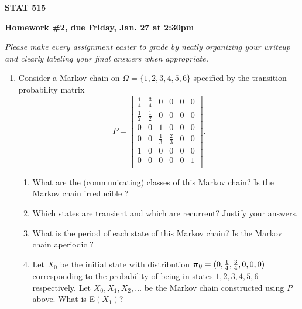 \documentclass{article}
\begin{document}
\begin{center}
{\bf STAT 515}

{\bf Homework \#2, due Friday, Jan. 27 at 2:30pm}
\end{center}

{\it Please make every assignment easier to grade by neatly organizing your
writeup and clearly labeling your final answers when appropriate.}
   

\begin{enumerate}

  \item\label{midtermprob} 
  Consider a Markov chain on $\Omega=\{1, 2, 3, 4, 5, 6\}$ specified by the
  transition probability matrix\\
  \begin{equation*}
    P=
    \begin{bmatrix}
      \frac{1}{4} & \frac{3}{4}   & 0  & 0 & 0 & 0\\
      \frac{1}{2} & \frac{1}{2}   & 0  & 0 & 0 & 0\\
       0 & 0  & 1  & 0 & 0 & 0\\
       0 & 0   & \frac{1}{3}  & \frac{2}{3} & 0 & 0\\
       1 & 0 & 0 & 0 & 0 & 0 \\
       0 & 0   & 0  & 0 & 0 & 1\\
    \end{bmatrix}.
  \end{equation*}
  \begin{enumerate}
    
    \item What are the (communicating) classes of this Markov chain? Is the
    Markov chain irreducible ?
    
    \item Which states are transient and which are recurrent? Justify your
    answers.
    
    \item What is the period of each state of this Markov chain? Is the Markov
    chain aperiodic ?
    
    \item\label{initial} Let $X_0$ be the initial state with distribution
    $\mbox{\boldmath $\pi$}_0 = (0, \frac{1}{4}, \frac{3}{4}, 0, 0, 0)^\top$
    corresponding to the probability of being in states $ 1, 2, 3, 4, 5, 6$
    respectively. Let $X_0, X_1, X_2,\dots$ be the Markov chain constructed
    using $P$ above. What is E$(X_1)$?


\end{enumerate}
\end{enumerate}
\end{document}
